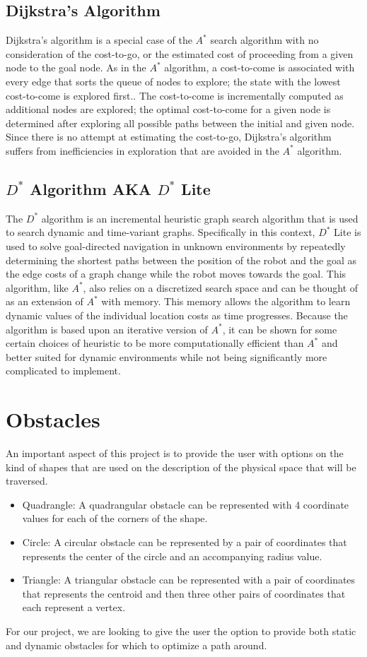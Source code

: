 \documentclass[10pt,twocolumn,letterpaper]{article}
\begin{document}
\subsection*{Dijkstra's Algorithm }
Dijkstra’s algorithm is a special case of the $A^*$ search algorithm with no consideration of the cost-to-go, or the estimated cost of proceeding from a given node to the goal node. As in the $A^*$ algorithm, a cost-to-come is associated with every edge that sorts the queue of nodes to explore; the state with the lowest cost-to-come is explored first.. The cost-to-come is incrementally computed as additional nodes are explored;  the optimal cost-to-come for a given node is determined after exploring all possible paths between the initial and given node. Since there is no attempt at estimating the cost-to-go, Dijkstra’s algorithm suffers from inefficiencies in exploration that are avoided in the $A^*$ algorithm.

\subsection*{$D^*$ Algorithm AKA $D^*$ Lite}
The $D^*$ algorithm is an incremental heuristic graph search algorithm that is used to search dynamic and time-variant graphs. Specifically in this context, $D^*$ Lite is used to solve goal-directed navigation in unknown environments by repeatedly determining the shortest paths between the position of the robot and the goal as the edge costs of a graph change while the robot moves towards the goal. This algorithm, like $A^*$, also relies on a discretized search space and can be thought of as an extension of $A^*$ with memory. This memory allows the algorithm to learn dynamic values of the individual location costs as time progresses. Because the algorithm is based upon an iterative version of $A^*$, it can be shown for some certain choices of heuristic to be more computationally efficient than $A^*$ and better suited for dynamic environments while not being significantly more complicated to implement.

\section*{Obstacles}
An important aspect of this project is to provide the user with options on the kind of shapes that are used on the description of the physical space that will be traversed. 
\begin{itemize}
    \item Quadrangle: A quadrangular obstacle can be represented with 4 coordinate values for each of the corners of the shape. 
    \item Circle: A circular obstacle can be represented by a pair of coordinates that represents the center of the circle and an accompanying radius value.
    \item Triangle: A triangular obstacle can be represented with a pair of coordinates that represents the centroid and then three other pairs of coordinates that each represent a vertex.
\end{itemize}
For our project, we are looking to give the user the option to provide both static and dynamic obstacles for which to optimize a path around. 
\end{document}
